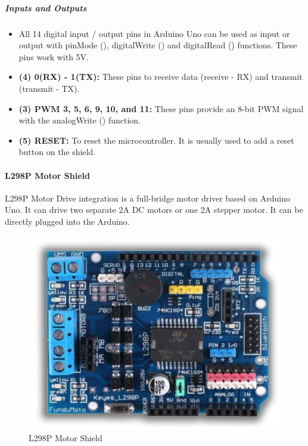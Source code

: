 \documentclass[11pt]{article}
\begin{document}
\vspace{0.1cm}

\subparagraph*{Inputs and Outputs}
\begin{itemize}
\item[] All 14 digital input / output pins in Arduino Uno can be used as input or output with pinMode (), digitalWrite () and digitalRead () functions. These pins work with 5V.
\item[] \textbf{(4) 0(RX) - 1(TX):} These pins to receive data (receive - RX) and transmit (transmit - TX).
\item[] \textbf{(3) PWM 3, 5, 6, 9, 10, and 11:} These pins provide an 8-bit PWM signal with the analogWrite () function.
\item[] \textbf{(5) RESET:} To reset the microcontroller. It is usually used to add a reset button on the shield.
\end{itemize}

\pagebreak

\paragraph{L298P Motor Shield}
\begin{flushleft}
L298P Motor Drive integration is a full-bridge motor driver based on Arduino Uno. It can drive two separate 2A DC motors or one 2A stepper motor. It can be directly plugged into the Arduino.
\end{flushleft}
\begin{figure}[h]
\centering
\includegraphics[scale=0.30]{l298.png}
\caption{L298P Motor Shield}
\end{figure}
\end{document}
